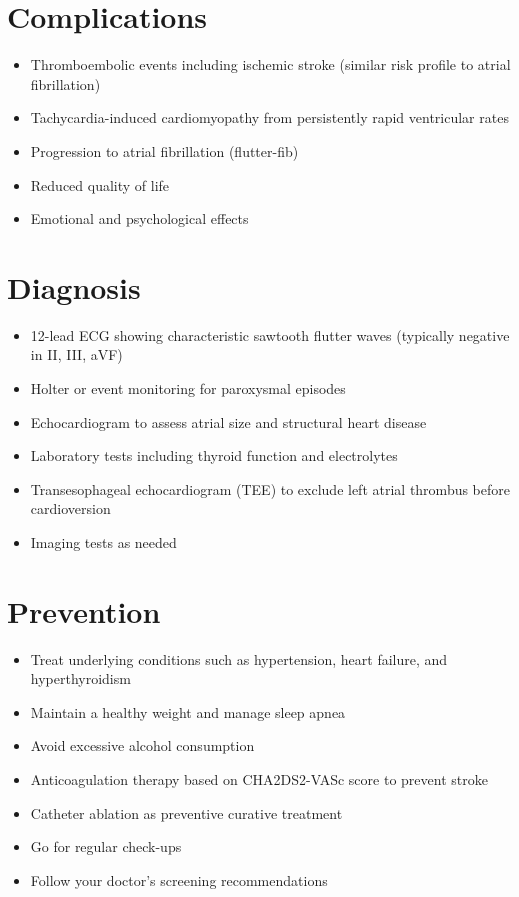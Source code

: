 \section{Complications}

\begin{itemize}[noitemsep]
  \item Thromboembolic events including ischemic stroke (similar risk profile to atrial fibrillation)
  \item Tachycardia-induced cardiomyopathy from persistently rapid ventricular rates
  \item Progression to atrial fibrillation (flutter-fib)
  \item Reduced quality of life
  \item Emotional and psychological effects
\end{itemize}

\section{Diagnosis}

\begin{itemize}[noitemsep]
  \item 12-lead ECG showing characteristic sawtooth flutter waves (typically negative in II, III, aVF)
  \item Holter or event monitoring for paroxysmal episodes
  \item Echocardiogram to assess atrial size and structural heart disease
  \item Laboratory tests including thyroid function and electrolytes
  \item Transesophageal echocardiogram (TEE) to exclude left atrial thrombus before cardioversion
  \item Imaging tests as needed
\end{itemize}

\section{Prevention}

\begin{itemize}[noitemsep]
  \item Treat underlying conditions such as hypertension, heart failure, and hyperthyroidism
  \item Maintain a healthy weight and manage sleep apnea
  \item Avoid excessive alcohol consumption
  \item Anticoagulation therapy based on CHA2DS2-VASc score to prevent stroke
  \item Catheter ablation as preventive curative treatment
  \item Go for regular check-ups
  \item Follow your doctor's screening recommendations
\end{itemize}

